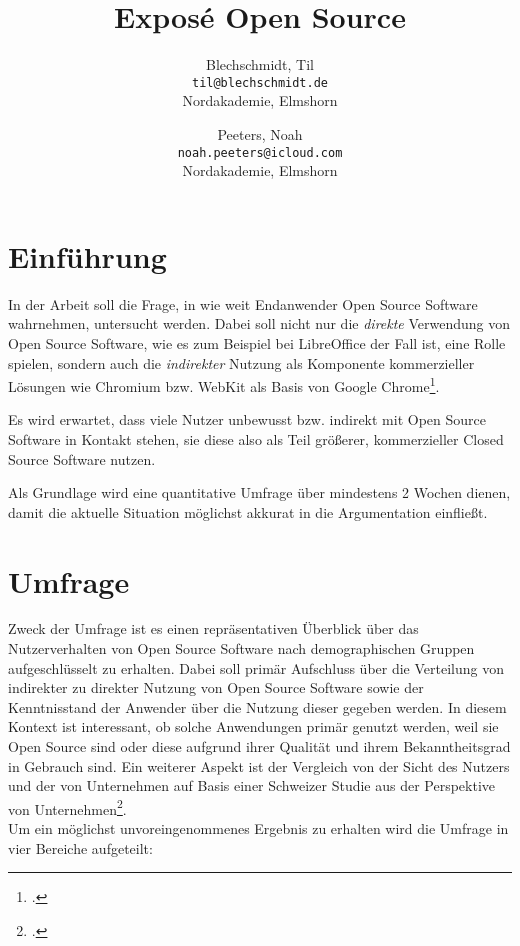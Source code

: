 \documentclass[a4paper]{article}
\title{Exposé Open Source}
\author{
  Blechschmidt, Til\\
  \texttt{til@blechschmidt.de}\\
  Nordakademie, Elmshorn
  \and
  Peeters, Noah\\
  \texttt{noah.peeters@icloud.com}\\
  Nordakademie, Elmshorn
}
\begin{document}
	\maketitle
	
	\section{Einführung}
		
		In der Arbeit soll die Frage, in wie weit Endanwender Open Source Software wahrnehmen, untersucht werden. Dabei soll nicht nur die \emph{direkte} Verwendung von Open Source Software, wie es zum Beispiel bei LibreOffice der Fall ist, eine Rolle spielen, sondern auch die \emph{indirekter} Nutzung als Komponente kommerzieller Lösungen wie Chromium bzw. WebKit als Basis von Google Chrome\footcite{is:open:source:right:for:you}.
		
		Es wird erwartet, dass viele Nutzer unbewusst bzw. indirekt mit Open Source Software in Kontakt stehen, sie diese also als Teil größerer, kommerzieller Closed Source Software nutzen.
		
		Als Grundlage wird eine quantitative Umfrage über mindestens 2 Wochen dienen, damit die aktuelle Situation möglichst akkurat in die Argumentation einfließt.
	
	\section{Umfrage}
		Zweck der Umfrage ist es einen repräsentativen Überblick über das Nutzerverhalten von Open Source Software nach demographischen Gruppen aufgeschlüsselt zu erhalten. Dabei soll primär Aufschluss über die Verteilung von indirekter zu direkter Nutzung von Open Source Software sowie der Kenntnisstand der Anwender über die Nutzung dieser gegeben werden. In diesem Kontext ist interessant, ob solche Anwendungen primär genutzt werden, weil sie Open Source sind oder diese aufgrund ihrer Qualität und ihrem Bekanntheitsgrad in Gebrauch sind. Ein weiterer Aspekt ist der Vergleich von der Sicht des Nutzers und der von Unternehmen auf Basis einer Schweizer Studie aus der Perspektive von Unternehmen\footcite{oss:studie}.\\
		Um ein möglichst unvoreingenommenes Ergebnis zu erhalten wird die Umfrage in vier Bereiche aufgeteilt:
	   
\end{document}
